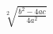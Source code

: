 \documentclass[preview]{standalone}
\begin{document}
\begin{align*}
\sqrt[2]{\frac{{b}^{2} - 4 a c}{4 {a}^{2}}}
\end{align*}
\end{document}
